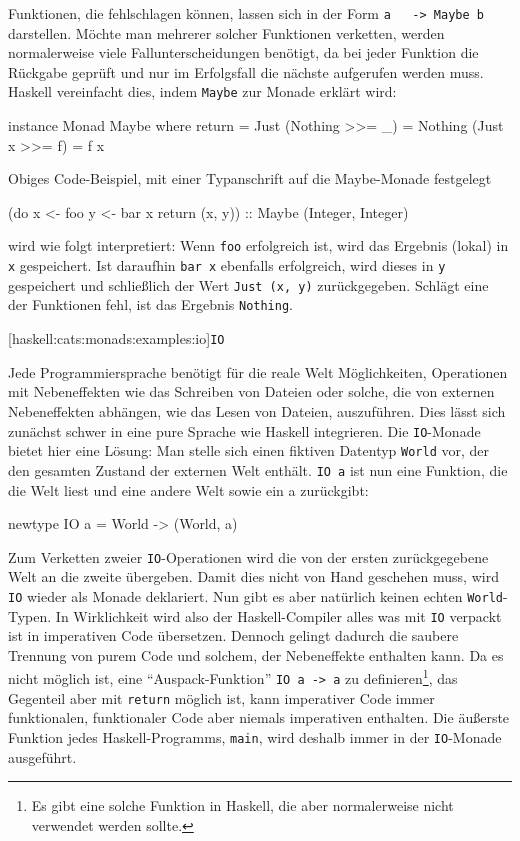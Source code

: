 \documentclass[12pt, a4paper, bibgerm]{scrbook}
\newenvironment{DIFnomarkup}{}{}
\newcommand\icode[1]{\lstinline?#1?}
\newcommand\lparagraph{}
\begin{document}
Funktionen, die fehlschlagen können, lassen sich in der Form \icode{a
  -> Maybe b} darstellen. Möchte man mehrerer solcher Funktionen
verketten, werden normalerweise viele Fallunterscheidungen benötigt, da
bei jeder Funktion die Rückgabe geprüft und nur im Erfolgsfall die
nächste aufgerufen werden muss. Haskell vereinfacht dies, indem \icode{Maybe}
zur Monade erklärt wird:
\begin{DIFnomarkup}\begin{code}
instance Monad Maybe
  where return = Just
        (Nothing >>= _) = Nothing
        (Just x  >>= f) = f x
\end{code}\end{DIFnomarkup} %
Obiges Code-Beispiel, mit einer Typanschrift auf die Maybe-Monade
festgelegt 
\begin{DIFnomarkup}\begin{code}
(do x <- foo
    y <- bar x
    return (x, y)) :: Maybe (Integer, Integer)
\end{code}\end{DIFnomarkup}
wird wie folgt interpretiert: Wenn \icode{foo} erfolgreich ist, wird das
Ergebnis (lokal) in \icode{x} gespeichert. Ist daraufhin \icode{bar x}
ebenfalls erfolgreich, wird dieses in \icode{y} gespeichert und
schließlich der Wert \icode{Just (x, y)} zurückgegeben. Schlägt eine der
Funktionen fehl, ist das Ergebnis \icode{Nothing}.

\lparagraph[haskell:cats:monads:examples:io]{\icode{IO}}

Jede Programmiersprache benötigt für die reale Welt Möglichkeiten,
Operationen mit Nebeneffekten wie das Schreiben von Dateien oder solche,
die von externen Nebeneffekten abhängen, wie das Lesen von Dateien,
auszuführen. Dies lässt sich zunächst schwer in eine pure Sprache wie
Haskell integrieren. Die \icode{IO}-Monade bietet hier eine Lösung: Man
stelle sich einen fiktiven Datentyp \icode{World} vor, der den gesamten
Zustand der externen Welt enthält. \icode{IO a} ist nun eine Funktion,
die die Welt liest und eine andere Welt sowie ein a zurückgibt:
\begin{DIFnomarkup}\begin{code}
newtype IO a = World -> (World, a)
\end{code}\end{DIFnomarkup}
Zum Verketten zweier \icode{IO}-Operationen wird die von der ersten
zurückgegebene Welt an die zweite übergeben. Damit dies nicht von Hand
geschehen muss, wird \icode{IO} wieder als Monade deklariert. Nun gibt
es aber natürlich keinen echten \icode{World}-Typen. In
Wirklichkeit wird also der Haskell-Compiler alles was mit \icode{IO}
verpackt ist in imperativen Code übersetzen. Dennoch gelingt dadurch
die saubere Trennung von purem Code und solchem, der Nebeneffekte
enthalten kann. Da es nicht möglich ist, eine "`Auspack-Funktion"'
\icode{IO a -> a} zu definieren\footnote{Es gibt eine solche Funktion in
  Haskell, die aber normalerweise nicht verwendet werden sollte.}, das
Gegenteil aber mit \icode{return} möglich ist, kann imperativer Code
immer funktionalen, funktionaler Code aber niemals imperativen
enthalten. Die äußerste Funktion jedes Haskell-Programms, \icode{main},
wird deshalb immer in der \icode{IO}-Monade ausgeführt.
\end{document}
